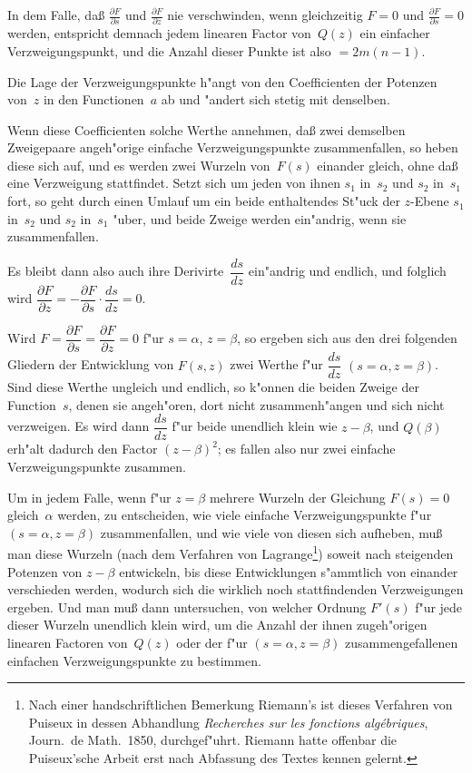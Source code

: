 \documentclass[12pt,a4paper]{article}
\begin{document}
In dem Falle, da\ss{} $\displaystyle\frac{\partial F}{\partial s}$ und $\displaystyle\frac{\partial F}{\partial z}$ nie
verschwinden, wenn gleichzeitig $F = 0$ und $\displaystyle\frac{\partial F}{\partial s} = 0$ werden,
entspricht demnach jedem linearen Factor von~$Q(z)$ ein einfacher
Verzweigungspunkt, und die Anzahl dieser Punkte ist also $= 2m(n-1)$.

Die Lage der Verzweigungspunkte h"angt von den Coefficienten der
Potenzen von~$z$ in den Functionen~$a$ ab und "andert sich stetig mit denselben.

Wenn diese Coefficienten solche Werthe annehmen, da\ss{} zwei demselben
Zweigepaare angeh"orige einfache Verzweigungspunkte zusammenfallen, so
heben diese sich auf, und es werden zwei Wurzeln von~$F(s)$ einander
gleich, ohne da\ss{} eine Verzweigung stattfindet. Setzt sich um jeden von
ihnen $s_1$ in~$s_2$ und $s_2$ in~$s_1$ fort, so geht durch einen Umlauf um ein
beide enthaltendes St"uck der $z$-Ebene $s_1$ in~$s_2$ und $s_2$ in~$s_1$ "uber,
und beide Zweige werden ein"andrig, wenn sie zusammenfallen.

Es bleibt dann also auch ihre Derivirte~$\dfrac{ds}{dz}$ ein"andrig und endlich,
und folglich wird $\dfrac{\partial F}{\partial z} = -\dfrac{\partial F}{\partial s} \cdot \dfrac{ds}{dz} = 0$.

Wird $F = \dfrac{\partial F}{\partial s} = \dfrac{\partial F}{\partial z} = 0$ f"ur $s = \alpha$, $z = \beta$,
so ergeben sich aus den drei folgenden Gliedern der Entwicklung von
$F(s,z)$ zwei Werthe f"ur $\dfrac{ds}{dz}$ $(s = \alpha, z = \beta)$. Sind diese
Werthe ungleich und endlich, so k"onnen die beiden Zweige der Function~$s$,
denen sie angeh"oren, dort nicht zusammenh"angen und sich nicht verzweigen.
Es wird dann $\dfrac{ds}{dz}$ f"ur beide unendlich klein wie $z - \beta$, und $Q(\beta)$
erh"alt dadurch den Factor $(z - \beta)^2$; es fallen also nur zwei einfache
Verzweigungspunkte zusammen.

Um in jedem Falle, wenn f"ur $z = \beta$ mehrere Wurzeln der Gleichung
$F(s) = 0$ gleich~$\alpha$ werden, zu entscheiden, wie viele einfache
Verzweigungspunkte f"ur $(s = \alpha, z = \beta)$ zusammenfallen, und wie viele
von diesen sich aufheben, mu\ss{} man diese Wurzeln (nach dem Verfahren
von Lagrange\footnote{Nach einer handschriftlichen Bemerkung Riemann's
ist dieses Verfahren von Puiseux in dessen Abhandlung \textit{Recherches
sur les fonctions alg\'{e}briques}, Journ.\ de Math.\ 1850, durchgef"uhrt.
Riemann hatte offenbar die Puiseux'sche Arbeit erst nach Abfassung des
Textes kennen gelernt.}) soweit nach steigenden Potenzen von $z - \beta$
entwickeln, bis diese Entwicklungen s"ammtlich von einander verschieden
werden, wodurch sich die wirklich noch stattfindenden Verzweigungen ergeben.
Und man mu\ss{} dann untersuchen, von welcher Ordnung $F'(s)$ f"ur jede
dieser Wurzeln unendlich klein wird, um die Anzahl der ihnen zugeh"origen
linearen Factoren von~$Q(z)$ oder der f"ur $(s = \alpha, z = \beta)$
zusammengefallenen einfachen Verzweigungspunkte zu bestimmen.
\end{document}
